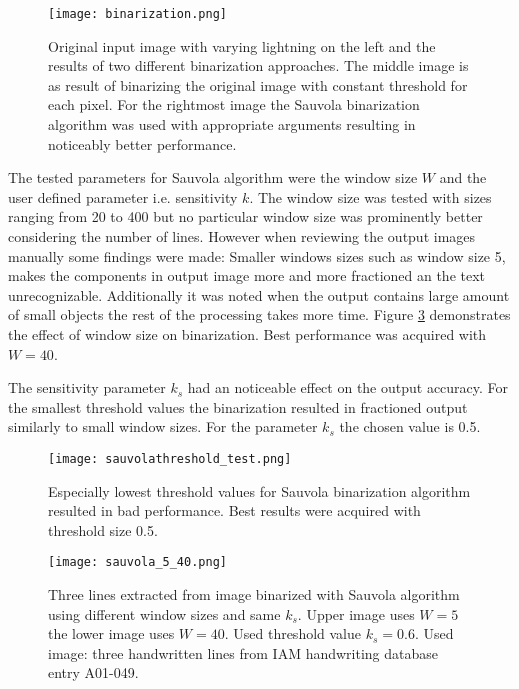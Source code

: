 \documentclass{article}
\begin{document}
    \begin{figure}[!ht]
      \centering
      \texttt{[image: binarization.png]}
      \caption{Original input image with varying lightning on the left and the results of two different binarization approaches. The middle image is as result of binarizing the original image with constant threshold for each pixel. For the rightmost image the Sauvola binarization algorithm was used with appropriate arguments resulting in noticeably better performance. \label{fig:binarization}}
    \end{figure}


    The tested parameters for Sauvola algorithm were the window size $W$ and the user defined parameter i.e. sensitivity $k$. The window size was tested with sizes ranging from 20 to 400 but no particular window size was prominently better considering the number of lines. However when reviewing the output images manually some findings were made: Smaller windows sizes such as window size 5, makes the components in output image more and more fractioned an the text unrecognizable. Additionally it was noted when the output contains large amount of small objects the rest of the processing takes more time. Figure \ref{fig:sauvola540} demonstrates the effect of window size on binarization. Best performance was acquired with $W = 40$.

    The sensitivity parameter $k_s$ had an noticeable effect on the output accuracy. For the smallest threshold values the binarization resulted in fractioned output similarly to small window sizes. For the parameter $k_s$ the chosen value is 0.5.

    \begin{figure}[!ht]
      \centering
      \texttt{[image: sauvolathreshold\_test.png]}
      \caption{Especially lowest threshold values for Sauvola binarization algorithm resulted in bad performance. Best results were acquired with threshold size 0.5. \label{fig:sauvolathreshold}}
    \end{figure}

    \begin{figure}[!ht]
      \centering
      \texttt{[image: sauvola\_5\_40.png]}
      \caption{Three lines extracted from image binarized with Sauvola algorithm using different window sizes and same $k_s$. Upper image uses $W = 5$  the lower image uses $W = 40$. Used threshold value $k_s = 0.6$. Used image: three handwritten lines from IAM handwriting database entry A01-049. \label{fig:sauvola540}}
    \end{figure}
\end{document}
